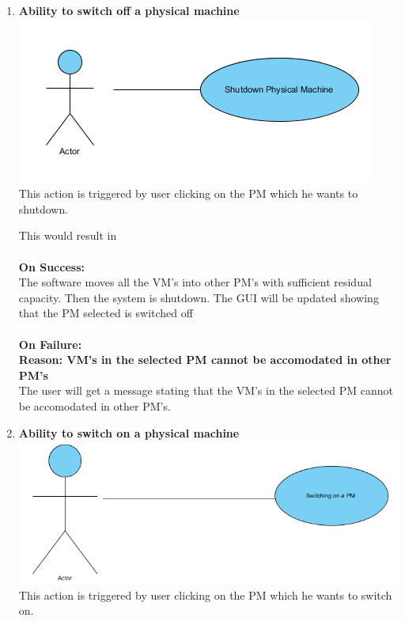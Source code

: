 \documentclass[a4paper,11pt]{article}
\begin{document}
\begin{enumerate}
				
				
				\item {\bf Ability to switch off a physical machine}\\
				\includegraphics{images/shut}
				\\This action is triggered by user clicking on the PM which he wants to shutdown. 
								
				This would result in \\\\
				{\bf On Success: }\\
				The software moves all the VM's into other PM's with sufficient residual capacity. Then the system is shutdown. 
				The GUI will be updated showing that the PM selected is switched off
				\\\\
				{\bf On Failure: } \\
				{\bf Reason: VM's in the selected PM cannot be accomodated in other PM's}\\
				The user will get a message stating that the VM's in the selected PM cannot be accomodated in other PM's.
				
				\item {\bf Ability to switch on a physical machine}\\
				\includegraphics[scale=0.7]{images/onpm}
				\\This action is triggered by user clicking on the PM which he wants to switch on. 
				

\end{enumerate}
\end{document}
